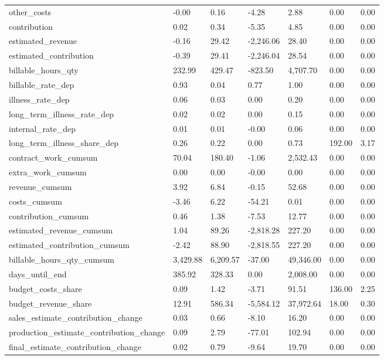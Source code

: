 \begin{landscape}
\begin{longtable}[h!]{lllllll}
other_costs & -0.00 & 0.16 & -4.28 & 2.88 & 0.00 & 0.00 \\
contribution & 0.02 & 0.34 & -5.35 & 4.85 & 0.00 & 0.00 \\
estimated_revenue & -0.16 & 29.42 & -2,246.06 & 28.40 & 0.00 & 0.00 \\
estimated_contribution & -0.39 & 29.41 & -2,246.04 & 28.54 & 0.00 & 0.00 \\
billable_hours_qty & 232.99 & 429.47 & -823.50 & 4,707.70 & 0.00 & 0.00 \\
billable_rate_dep & 0.93 & 0.04 & 0.77 & 1.00 & 0.00 & 0.00 \\
illness_rate_dep & 0.06 & 0.03 & 0.00 & 0.20 & 0.00 & 0.00 \\
long_term_illness_rate_dep & 0.02 & 0.02 & 0.00 & 0.15 & 0.00 & 0.00 \\
internal_rate_dep & 0.01 & 0.01 & -0.00 & 0.06 & 0.00 & 0.00 \\
long_term_illness_share_dep & 0.26 & 0.22 & 0.00 & 0.73 & 192.00 & 3.17 \\
contract_work_cumsum & 70.04 & 180.40 & -1.06 & 2,532.43 & 0.00 & 0.00 \\
extra_work_cumsum & 0.00 & 0.00 & -0.00 & 0.00 & 0.00 & 0.00 \\
revenue_cumsum & 3.92 & 6.84 & -0.15 & 52.68 & 0.00 & 0.00 \\
costs_cumsum & -3.46 & 6.22 & -54.21 & 0.01 & 0.00 & 0.00 \\
contribution_cumsum & 0.46 & 1.38 & -7.53 & 12.77 & 0.00 & 0.00 \\
estimated_revenue_cumsum & 1.04 & 89.26 & -2,818.28 & 227.20 & 0.00 & 0.00 \\
estimated_contribution_cumsum & -2.42 & 88.90 & -2,818.55 & 227.20 & 0.00 & 0.00 \\
billable_hours_qty_cumsum & 3,429.88 & 6,209.57 & -37.00 & 49,346.00 & 0.00 & 0.00 \\
days_until_end & 385.92 & 328.33 & 0.00 & 2,008.00 & 0.00 & 0.00 \\
budget_costs_share & 0.09 & 1.42 & -3.71 & 91.51 & 136.00 & 2.25 \\
budget_revenue_share & 12.91 & 586.34 & -5,584.12 & 37,972.64 & 18.00 & 0.30 \\
sales_estimate_contribution_change & 0.03 & 0.66 & -8.10 & 16.20 & 0.00 & 0.00 \\
production_estimate_contribution_change & 0.09 & 2.79 & -77.01 & 102.94 & 0.00 & 0.00 \\
final_estimate_contribution_change & 0.02 & 0.79 & -9.64 & 19.70 & 0.00 & 0.00 \\

\end{longtable}
\end{landscape}
